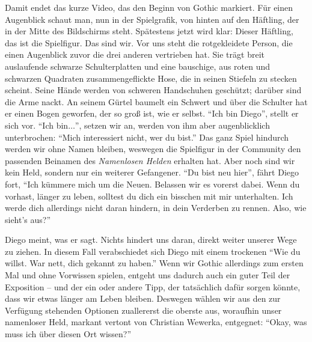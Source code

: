 \documentclass[a5paper,pagesize]{scrbook}
\begin{document}
Damit endet das kurze Video, das den Beginn von Gothic markiert.
Für einen Augenblick schaut man, nun in der Spielgrafik, von hinten auf den Häftling, der in der Mitte des Bildschirms steht.
Spätestens jetzt wird klar:
Dieser Häftling, das ist die Spielfigur.
Das sind wir.
Vor uns steht die rotgekleidete Person, die einen Augenblick zuvor die drei anderen vertrieben hat.
Sie trägt breit auslaufende schwarze Schulterplatten und eine bauschige, aus roten und schwarzen Quadraten zusammengeflickte Hose, die in seinen Stiefeln zu stecken scheint.
Seine Hände werden von schweren Handschuhen geschützt; darüber sind die Arme nackt.
An seinem Gürtel baumelt ein Schwert und über die Schulter hat er einen Bogen geworfen, der so groß ist, wie er selbst.
\enquote{Ich bin Diego}, stellt er sich vor.
\enquote{Ich bin$\ldots$}, setzen wir an, werden von ihm aber augenblicklich unterbrochen:
\enquote{Mich interessiert nicht, wer du bist.}
Das ganz Spiel hindurch werden wir ohne Namen bleiben, weswegen die Spielfigur in der Community den passenden Beinamen des \textit{Namenlosen Helden} erhalten hat.
Aber noch sind wir kein Held, sondern nur ein weiterer Gefangener.
\enquote{Du bist neu hier}, fährt Diego fort, \enquote{Ich kümmere mich um die Neuen.
Belassen wir es vorerst dabei.
Wenn du vorhast, länger zu leben, solltest du dich ein bisschen mit mir unterhalten.
Ich werde dich allerdings nicht daran hindern, in dein Verderben zu rennen.
Also, wie sieht's aus?}

Diego meint, was er sagt.
Nichts hindert uns daran, direkt weiter unserer Wege zu ziehen.
In diesem Fall verabschiedet sich Diego mit einem trockenen \enquote{Wie du willst.
War nett, dich gekannt zu haben.}
Wenn wir Gothic allerdings zum ersten Mal und ohne Vorwissen spielen, entgeht uns dadurch auch ein guter Teil der Exposition -- und der ein oder andere Tipp, der tatsächlich dafür sorgen könnte, dass wir etwas länger am Leben bleiben.
Deswegen wählen wir aus den zur Verfügung stehenden Optionen zuallererst die oberste aus, woraufhin unser namenloser Held, markant vertont von Christian Wewerka, entgegnet:
\enquote{Okay, was muss ich über diesen Ort wissen?}
\end{document}
